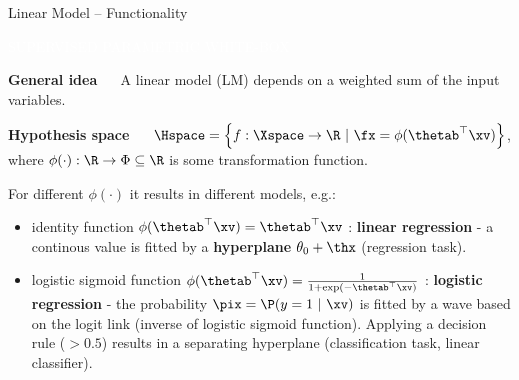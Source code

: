 \documentclass[11pt,compress,t,notes=noshow, xcolor=table]{beamer}
\newcommand{\maketag}[1]{\colorbox{highlightcol}{\textcolor{white}
{\MakeUppercase{#1}}}}
\newcommand{\highlight}[1]{\textcolor{highlightcol}{\textbf{#1}}}
\begin{document}
\begin{frame}{Linear Model -- Functionality}

\footnotesize

\maketag{SUPERVISED}
\maketag{PARAMETRIC}
\maketag{WHITE-BOX}


\medskip


\highlight{General idea} ~~  
A linear model (LM) depends on a weighted sum of the input variables.



\medskip

\highlight{Hypothesis space} ~~
$\Hspace = \left\{f: \Xspace \to \R ~|~\fx = \phi(\thetab^\top \xv)\right\}$, 
where $\phi(\cdot): \R \to \Phi \subseteq \R$ is some transformation function.

\smallskip

For different $\phi(\cdot)$ it results in different models, e.g.: 
\begin{itemize}
  \item identity function $\phi(\thetab^\top \xv) = \thetab^\top \xv$ :  \textbf{linear regression} - a continous value is fitted by a \textbf{hyperplane} $\theta_0 + \thx$ (regression task).
  \item logistic sigmoid function $\phi(\thetab^\top \xv) = \frac{1}{1 + \exp(- \thetab^\top \xv)}$ : \textbf{logistic regression} - the probability $\pix = \P(y = 1 ~|~\xv)$ is fitted by a wave based on the logit link (inverse of logistic sigmoid function). Applying a decision rule ($>0.5$) results in a separating hyperplane (classification task, linear classifier). 

\end{itemize}





\end{frame}
\end{document}
